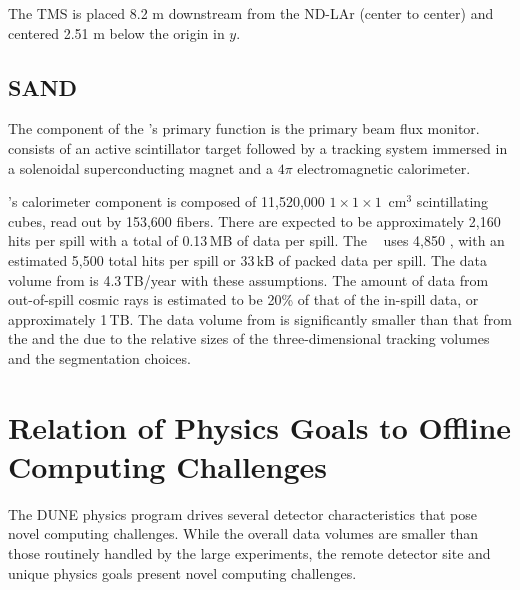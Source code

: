 \documentclass[../main-v1.tex]{subfiles}
\begin{document}
The TMS is placed 8.2 m downstream from the ND-LAr (center to center) and centered 2.51 m below the origin in $y$. 


\subsection{SAND }
\label{sec:comp-dataestimates-sand}

The  component of the 's primary function is the primary beam flux monitor.    consists of an active scintillator target  followed by a tracking system immersed in a solenoidal superconducting magnet  and  a $4\pi$ electromagnetic calorimeter.

's  calorimeter component is composed of 11,520,000 $1\times 1\times 1$~cm$^3$ scintillating cubes, read out by 153,600 fibers.  There are expected to be approximately 2,160 hits per spill with a total of 0.13\,MB of data per spill.  The  ~\cite{Adinolfi:2002zx} uses 4,850 , with an estimated 5,500 total hits per spill or 33\,kB of packed data per spill.   The data volume from  is 4.3\,TB/year with these assumptions.  The amount of data from out-of-spill cosmic rays is estimated to be 20\% of that of the in-spill data, or approximately 1\,TB.  The data volume from  is significantly smaller than that from the  and the  due to the relative sizes of the three-dimensional tracking volumes and the segmentation choices.





\section{Relation of Physics Goals to Offline Computing Challenges }

The DUNE physics program drives several detector characteristics that pose novel computing challenges.  While the overall data volumes are smaller than those routinely handled by the large  experiments, the remote detector site and unique physics goals present novel computing challenges. 
\end{document}
